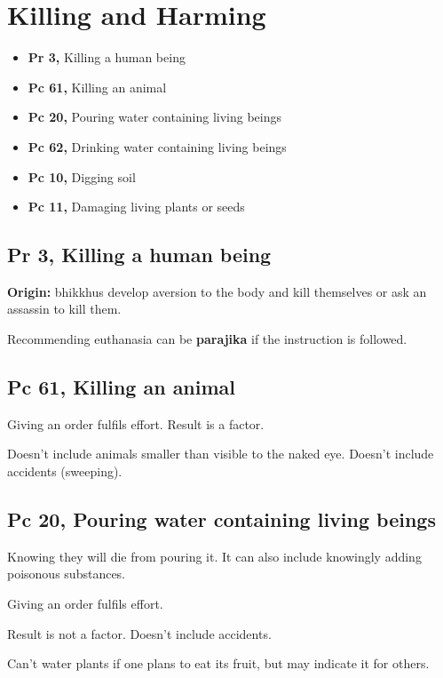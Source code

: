 \chapter{Killing and Harming}

\begin{itemize}
\tightlist
\item
  \textbf{Pr 3,} Killing a human being
\item
  \textbf{Pc 61,} Killing an animal
\item
  \textbf{Pc 20,} Pouring water containing living beings
\item
  \textbf{Pc 62,} Drinking water containing living beings
\item
  \textbf{Pc 10,} Digging soil
\item
  \textbf{Pc 11,} Damaging living plants or seeds
\end{itemize}

\section{Pr 3, Killing a human being}


\textbf{Origin:} bhikkhus develop aversion to the body and kill
themselves or ask an assassin to kill them.

Recommending euthanasia can be \textbf{parajika} if the instruction is
followed.

\section{Pc 61, Killing an animal}

Giving an order fulfils effort. Result is a factor.

Doesn't include animals smaller than visible to the naked eye. Doesn't
include accidents (sweeping).

\section{Pc 20, Pouring water containing living beings}

Knowing they will die from pouring it. It can also include knowingly
adding poisonous substances.

Giving an order fulfils effort.

Result is not a factor. Doesn't include accidents.

Can't water plants if one plans to eat its fruit, but may indicate it
for others.

